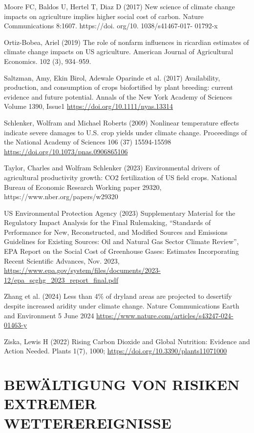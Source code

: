 \documentclass[12pt,paper=a4,DIV=12,parskip=never,chapterprefix=false,headings=standardclasses]{scrreprt}
\begin{document}
Moore FC, Baldos U, Hertel T, Diaz D (2017) New science of climate change impacts on agriculture implies
higher social cost of carbon. Nature Communications 8:1607. https://doi. org/10. 1038/s41467-017-
01792-x

Ortiz-Bobea, Ariel (2019) The role of nonfarm influences in ricardian estimates of climate change impacts
on US agriculture. American Journal of Agricultural Economics. 102 (3), 934–959.

Saltzman, Amy, Ekin Birol, Adewale Oparinde et al. (2017) Availability, production, and consumption of
crops biofortified by plant breeding: current evidence and future potential. Annals of the New York
Academy of Sciences Volume 1390, Issue1 \url{https://doi.org/10.1111/nyas.13314}

Schlenker, Wolfram and Michael Roberts (2009) Nonlinear temperature effects indicate severe damages to
U.S. crop yields under climate change. Proceedings of the National Academy of Sciences
106 (37) 15594-15598 \url{https://doi.org/10.1073/pnas.0906865106}

Taylor, Charles and Wolfram Schlenker (2023) Environmental drivers of agricultural productivity growth:
CO2 fertilization of US field crops. National Bureau of Economic Research Working paper 29320,
https://www.nber.org/papers/w29320

US Environmental Protection Agency (2023) Supplementary Material for the Regulatory Impact Analysis
for the Final Rulemaking, “Standards of Performance for New, Reconstructed, and Modified Sources
and Emissions Guidelines for Existing Sources: Oil and Natural Gas Sector Climate Review”, EPA
Report on the Social Cost of Greenhouse Gases: Estimates Incorporating Recent Scientific Advances,
Nov. 2023, \url{https://www.epa.gov/system/files/documents/2023-12/epa_scghg_2023_report_final.pdf}

Zhang et al. (2024) Less than 4\% of dryland areas are projected to desertify despite increased aridity under
climate change. Nature Communications Earth and Environment 5 June 2024
\url{https://www.nature.com/articles/s43247-024-01463-y}

Ziska, Lewis H (2022) Rising Carbon Dioxide and Global Nutrition: Evidence and Action Needed. Plants
1(7), 1000; \url{https://doi.org/10.3390/plants11071000}

\endgroup


\cleardoublepage
\chapter{BEWÄLTIGUNG VON RISIKEN EXTREMER WETTEREREIGNISSE}
\end{document}
